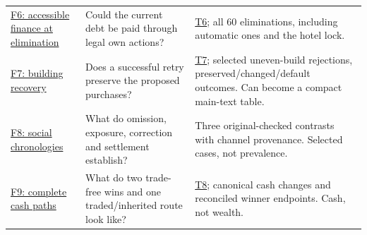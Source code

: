 \begin{longtable}{L{\dimexpr\linewidth/3-2\tabcolsep\relax}L{\dimexpr\linewidth/3-2\tabcolsep\relax}L{\dimexpr\linewidth/3-2\tabcolsep\relax}}
\href{run:../astra/exhibits/f06_elimination_financing.png}{F6: accessible finance at elimination} & Could the current debt be paid through legal own actions? & \href{run:../astra/exhibits/t06_eliminations.csv}{T6}; all 60 eliminations, including automatic ones and the hotel lock. \\
\href{run:../astra/exhibits/f07_build_recovery.png}{F7: building recovery} & Does a successful retry preserve the proposed purchases? & \href{run:../astra/exhibits/t07_build_recovery.csv}{T7}; selected uneven-build rejections, preserved/changed/default outcomes. Can become a compact main-text table. \\
\href{run:../astra/exhibits/f08_social_chronology.png}{F8: social chronologies} & What do omission, exposure, correction and settlement establish? & Three original-checked contrasts with channel provenance. Selected cases, not prevalence. \\
\href{run:../astra/exhibits/f09_cash_trajectories.png}{F9: complete cash paths} & What do two trade-free wins and one traded/inherited route look like? & \href{run:../astra/exhibits/t08_cash_trajectories.csv}{T8}; canonical cash changes and reconciled winner endpoints. Cash, not wealth. \\
\bottomrule
\end{longtable}
\endgroup
